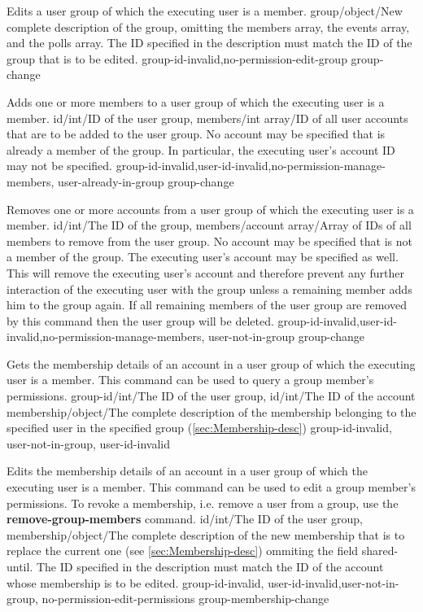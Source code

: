 \documentclass[parskip=full,11pt]{scrartcl}
\begin{document}
{Edits a user group of which the executing user is a member.}
{group/object/New complete description of the group{,} omitting the members
array{,} the events array{,} and the polls array.
The ID specified in the description must match the ID of the group that
is to be edited.}
{}
{group-id-invalid,no-permission-edit-group}
{group-change}

{Adds one or more members to a user group of which the executing user is a
member.}
{id/int/ID of the user group,
members/int array/ID of all user accounts that are to be added to the user
group.
No account may be specified that is already a member of the group.
In particular{,} the executing user's account ID may not be specified.}
{}
{group-id-invalid,user-id-invalid,no-permission-manage-members,%
user-already-in-group}
{group-change}

{Removes one or more accounts from a user group of which the executing user is
a member.}
{id/int/The ID of the group,
members/account array/Array of IDs of all members to remove from the user
group.
No account may be specified that is not a member of the group.
The executing user's account may be specified as well.
This will remove the executing user's account and therefore prevent any further
interaction of the executing user with the group unless a remaining member adds
him to the group again.
If all remaining members of the user group are removed by this command then the
user group will be deleted.}
{}
{group-id-invalid,user-id-invalid,no-permission-manage-members,
user-not-in-group}
{group-change}

{Gets the membership details of an account in a user group of which the
executing user is a member.
This command can be used to query a group member's permissions.}
{group-id/int/The ID of the user group,
id/int/The ID of the account}
{membership/object/The complete description of the membership belonging to
the specified user in the specified group (\ref{sec:Membership-desc})}
{group-id-invalid, user-not-in-group, user-id-invalid}
{}

{Edits the membership details of an account in a user group of which the
executing user is a member.
This command can be used to edit a group member's permissions.
To revoke a membership, i.e. remove a user from a group, use the
\textbf{remove-group-members} command.}
{id/int/The ID of the user group,
membership/object/The complete description of the new membership that is to
replace the current one (see \ref{sec:Membership-desc}) ommiting the
field shared-until.
The ID specified in the description must match the ID of the account whose
membership is to be edited.}
{}
{group-id-invalid, user-id-invalid,user-not-in-group, no-permission-edit-permissions}
{group-membership-change}
\end{document}
